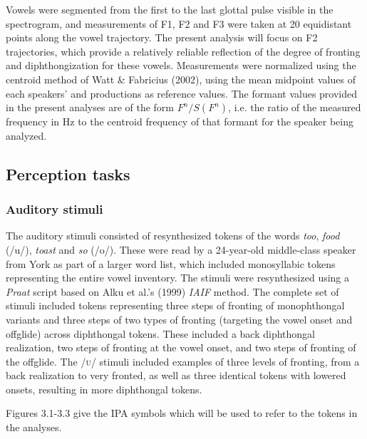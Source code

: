 \documentclass[PWPL]{article}
\begin{document}
Vowels were segmented from the first to the last glottal pulse visible in the spectrogram, and measurements of F1, F2 and F3 were taken at 20 equidistant points along the vowel trajectory. The present analysis will focus on F2 trajectories, which provide a relatively reliable reflection of the degree of fronting and diphthongization for these vowels. Measurements were normalized using the centroid method of Watt \& Fabricius (2002), using the mean midpoint values of each speakers'  and  productions as reference values. The formant values provided in the present analyses are of the form $F^n/S (F^n)$, i.e. the ratio of the measured frequency in Hz to the centroid frequency of that formant for the speaker being analyzed.

\subsection{Perception tasks}

\subsubsection{Auditory stimuli}

The auditory stimuli consisted of resynthesized tokens of the words \textit{too}, \textit{food} (/u/), \textit{toast} and \textit{so} (/o/). These were read by a 24-year-old middle-class speaker from York as part of a larger word list, which included monosyllabic tokens representing the entire vowel inventory. The stimuli were resynthesized using a \textit{Praat} script based on Alku et al.'s (1999) \textit{IAIF} method. The complete set of  stimuli included tokens representing three steps of fronting of monophthongal variants and three steps of two types of fronting (targeting the vowel onset and offglide) across diphthongal tokens. These included a back diphthongal realization, two steps of fronting at the vowel onset, and two steps of fronting of the offglide. The \textsc{/u/} stimuli included examples of three levels of fronting, from a back realization to very fronted, as well as three identical tokens with lowered onsets, resulting in more diphthongal tokens.

Figures 3.1-3.3 give the IPA symbols which will be used to refer to the tokens in the analyses. 
\end{document}
